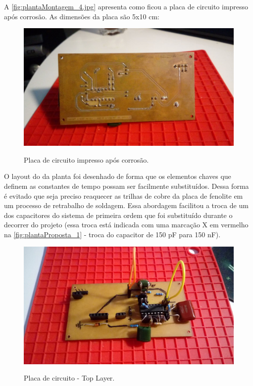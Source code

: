 \documentclass[
	article,			%
	11pt,				%
	oneside,			%
	a4paper,			%
	english,			%
	brazil,				%
	sumario=tradicional
	]{abntex2}
\begin{document}
A \autoref{fig:plantaMontagem_4.jpg} apresenta como ficou a placa de circuito impresso após corrosão. As dimensões da placa são 5x10 cm:

\begin{figure}[htb!]
	\centering
	\caption{Placa de circuito impresso após corrosão.}
	\includegraphics[scale=0.23]{./img/plantaMontagem_4.jpg}
	\label{fig:plantaMontagem_4.jpg}
\end{figure}

\pagebreak

O layout do da planta foi desenhado de forma que os elementos chaves que definem as constantes de tempo possam ser facilmente substituídos. 
Dessa forma é evitado que seja preciso reaquecer as trilhas de cobre da placa de fenolite em um processo de retrabalho de soldagem.
Essa abordagem facilitou a troca de um dos capacitores do sistema de primeira ordem que foi substituído durante o decorrer do projeto (essa troca está indicada com uma marcação X em vermelho na \autoref{fig:plantaProposta_1} - troca do capacitor de 150 pF para 150 nF). 

\begin{figure}[htb!]
	\centering
	\caption{Placa de circuito - Top Layer.}
	\includegraphics[scale=0.23]{./img/plantaMontagem_2.jpg}
	\label{fig:plantaMontagem_2}
\end{figure}
\end{document}
